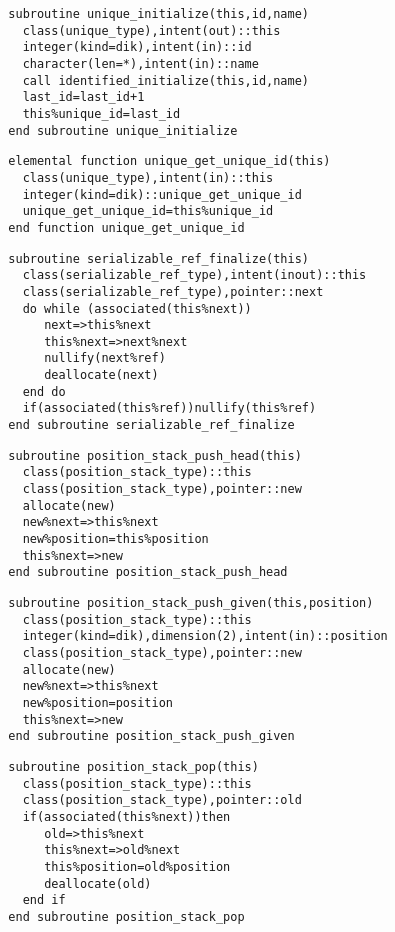 \begin{Verbatim}
  subroutine unique_initialize(this,id,name)
    class(unique_type),intent(out)::this
    integer(kind=dik),intent(in)::id
    character(len=*),intent(in)::name
    call identified_initialize(this,id,name)
    last_id=last_id+1
    this%unique_id=last_id
  end subroutine unique_initialize
\end{Verbatim}

\begin{Verbatim}
  elemental function unique_get_unique_id(this)
    class(unique_type),intent(in)::this
    integer(kind=dik)::unique_get_unique_id
    unique_get_unique_id=this%unique_id
  end function unique_get_unique_id
\end{Verbatim}
\begin{Verbatim}
  subroutine serializable_ref_finalize(this)
    class(serializable_ref_type),intent(inout)::this
    class(serializable_ref_type),pointer::next
    do while (associated(this%next))
       next=>this%next
       this%next=>next%next
       nullify(next%ref)
       deallocate(next)
    end do
    if(associated(this%ref))nullify(this%ref)
  end subroutine serializable_ref_finalize
\end{Verbatim}
\begin{Verbatim}
  subroutine position_stack_push_head(this)
    class(position_stack_type)::this
    class(position_stack_type),pointer::new
    allocate(new)
    new%next=>this%next
    new%position=this%position
    this%next=>new
  end subroutine position_stack_push_head
\end{Verbatim}

\begin{Verbatim}
  subroutine position_stack_push_given(this,position)
    class(position_stack_type)::this
    integer(kind=dik),dimension(2),intent(in)::position
    class(position_stack_type),pointer::new
    allocate(new)
    new%next=>this%next
    new%position=position
    this%next=>new
  end subroutine position_stack_push_given
\end{Verbatim}

\begin{Verbatim}
  subroutine position_stack_pop(this)
    class(position_stack_type)::this
    class(position_stack_type),pointer::old
    if(associated(this%next))then
       old=>this%next
       this%next=>old%next
       this%position=old%position
       deallocate(old)
    end if
  end subroutine position_stack_pop
\end{Verbatim}

